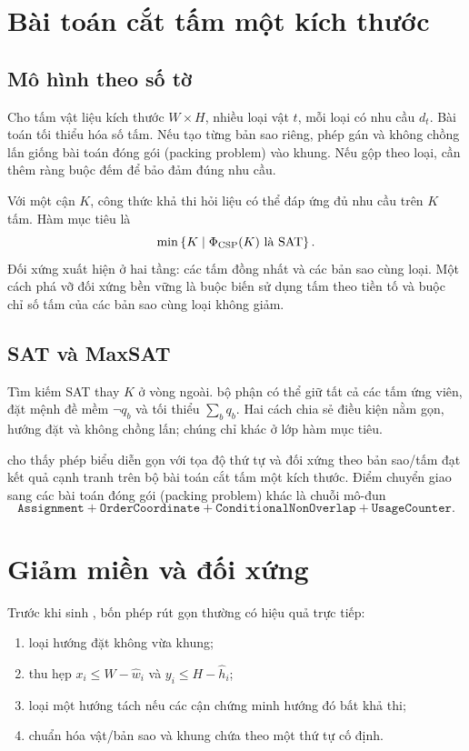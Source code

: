 \section{Bài toán cắt tấm một kích thước}

\subsection{Mô hình theo số tờ}

Cho tấm vật liệu kích thước \(W\times H\), nhiều loại vật \(t\), mỗi loại có
nhu cầu \(d_t\). Bài toán tối thiểu hóa số tấm. Nếu tạo từng bản sao riêng,
phép gán và không chồng lấn giống bài toán đóng gói (packing problem) vào khung. Nếu gộp theo
loại, cần thêm ràng buộc đếm để bảo đảm đúng nhu cầu.

Với một cận \(K\), công thức khả thi hỏi liệu có thể đáp ứng đủ nhu cầu trên
\(K\) tấm. Hàm mục tiêu là
\[
  \min\left\{K\mid \Phi_{\mathrm{CSP}}(K)\text{ là SAT}\right\}.
\]
Đối xứng xuất hiện ở hai tầng: các tấm đồng nhất và các bản sao cùng loại. Một
cách phá vỡ đối xứng bền vững là buộc biến sử dụng tấm theo tiền tố và buộc chỉ
số tấm của các bản sao cùng loại không giảm.

\subsection{SAT và MaxSAT}

Tìm kiếm SAT thay \(K\) ở vòng ngoài. \MaxSAT bộ phận có thể giữ tất cả các
tấm ứng viên, đặt mệnh đề mềm \(\neg q_b\) và tối thiểu
\(\sum_bq_b\). Hai cách chia sẻ điều kiện nằm gọn, hướng đặt và không chồng
lấn; chúng chỉ khác ở lớp hàm mục tiêu.

\textcite{kieu2026cutting} cho thấy phép biểu diễn gọn với tọa độ thứ tự và đối
xứng theo bản sao/tấm đạt kết quả cạnh tranh trên bộ bài toán cắt tấm một kích
thước. Điểm chuyển giao sang các bài toán đóng gói (packing problem) khác là chuỗi mô-đun
\[
  \texttt{Assignment}
  +\texttt{OrderCoordinate}
  +\texttt{ConditionalNonOverlap}
  +\texttt{UsageCounter}.
\]

\section{Giảm miền và đối xứng}

Trước khi sinh \CNF, bốn phép rút gọn thường có hiệu quả trực tiếp:
\begin{enumerate}
  \item loại hướng đặt không vừa khung;
  \item thu hẹp \(x_i\le W-\widehat w_i\) và
        \(y_i\le H-\widehat h_i\);
  \item loại một hướng tách nếu các cận chứng minh hướng đó bất khả thi;
  \item chuẩn hóa vật/bản sao và khung chứa theo một thứ tự cố định.
\end{enumerate}

